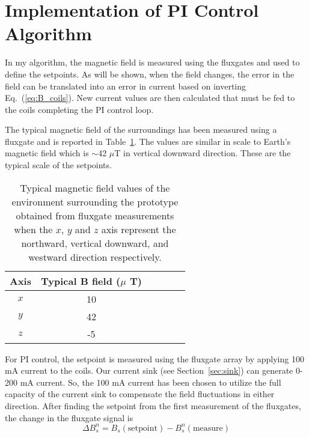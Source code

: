 \section{Implementation of PI Control Algorithm}\label{sec:pi}
 In my algorithm, the magnetic field is measured using the fluxgates and used to define the setpoints. As will be shown, when the field changes, the error in the field can be translated into an error in current based on inverting Eq.~(\ref{eq:B_coils}). New current values are then calculated that must be fed to the coils completing the PI control loop. 


The typical magnetic field of the surroundings has been measured using a fluxgate and is reported in Table~\ref{table:Benvironment}. The values are similar in scale to Earth's magnetic field which is $\sim$42 $\mu$T in vertical downward direction. These are the typical scale of the setpoints.

\begin{table} 
    \centering
    \begin{tabular} { |c|c|c|c|c|c|} 
        \hline
        Axis & \makecell{Typical B field \\($\mu$ T)}\\
        \hline\hline
        $x$ & 10 \\ 
        \hline
        $y$ & 42 \\ 
        \hline
        $z$ & -5 \\ 
        \hline
    \end{tabular}
    \caption[Typical magnetic fields surrounding the prototype]{Typical magnetic field values of the environment surrounding the prototype obtained from fluxgate measurements when the $x$, $y$ and $z$ axis represent the northward, vertical downward, and westward direction respectively. }\label{table:Benvironment}
\end{table}

For PI control, the setpoint is measured using the fluxgate array by applying 100 mA current to the coils. Our current sink (see Section~\ref{sec:sink}) can generate 0-200 mA current. So, the 100 mA current has been chosen to utilize the full capacity of the current sink to compensate the field fluctuations in either direction. After finding the setpoint from the first measurement of the fluxgates, the change in the fluxgate signal is
\begin{equation}\label{eq:del_B}
    \Delta B_s^n = B_s(\mathrm{setpoint}) - B_s^n(\mathrm{measure})
\end{equation}

